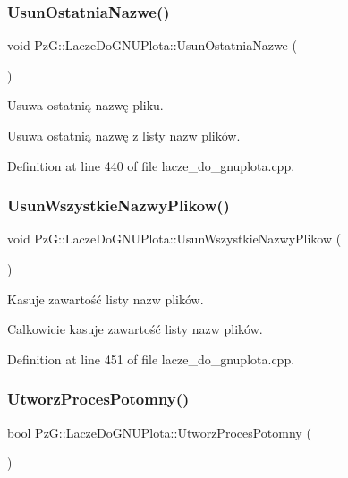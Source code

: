 \subsubsection{\texorpdfstring{Usun\+Ostatnia\+Nazwe()}{UsunOstatniaNazwe()}}
{\footnotesize\ttfamily void Pz\+G\+::\+Lacze\+Do\+G\+N\+U\+Plota\+::\+Usun\+Ostatnia\+Nazwe (\begin{DoxyParamCaption}{ }\end{DoxyParamCaption})}



Usuwa ostatnią nazwę pliku. 

Usuwa ostatnią nazwę z listy nazw plików. 

Definition at line 440 of file lacze\+\_\+do\+\_\+gnuplota.\+cpp.

\mbox{\label{class_pz_g_1_1_lacze_do_g_n_u_plota_a89a1d90d017d264cd26398464d074073}} 
\subsubsection{\texorpdfstring{Usun\+Wszystkie\+Nazwy\+Plikow()}{UsunWszystkieNazwyPlikow()}}
{\footnotesize\ttfamily void Pz\+G\+::\+Lacze\+Do\+G\+N\+U\+Plota\+::\+Usun\+Wszystkie\+Nazwy\+Plikow (\begin{DoxyParamCaption}{ }\end{DoxyParamCaption})}



Kasuje zawartość listy nazw plików. 

Calkowicie kasuje zawartość listy nazw plików. 

Definition at line 451 of file lacze\+\_\+do\+\_\+gnuplota.\+cpp.

\mbox{\label{class_pz_g_1_1_lacze_do_g_n_u_plota_a1c7b9acc40de8d8bbb40fb0722512933}} 
\subsubsection{\texorpdfstring{Utworz\+Proces\+Potomny()}{UtworzProcesPotomny()}}
{\footnotesize\ttfamily bool Pz\+G\+::\+Lacze\+Do\+G\+N\+U\+Plota\+::\+Utworz\+Proces\+Potomny (\begin{DoxyParamCaption}{ }\end{DoxyParamCaption})\hspace{0.3cm}{\ttfamily [protected]}}



